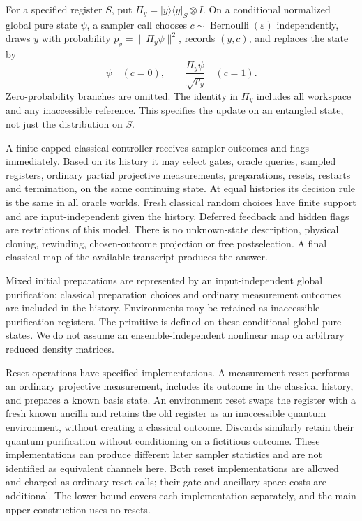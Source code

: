 \documentclass[11pt]{article}
\theoremstyle{remark}
\newcommand{\eps}{\varepsilon}
\newcommand{\ket}[1]{\lvert #1\rangle}
\newcommand{\bra}[1]{\langle #1\rvert}
\begin{document}
For a specified register $S$, put
$\Pi_y=\ket{y}\bra{y}_S\otimes I$. On a conditional normalized global pure
state $\psi$, a sampler call chooses $c\sim\operatorname{Bernoulli}(\eps)$
independently, draws $y$ with probability $p_y=\|\Pi_y\psi\|^2$, records
$(y,c)$, and replaces the state by
\begin{equation}\label{eq:instrument}
 \psi\quad(c=0),\qquad
 \frac{\Pi_y\psi}{\sqrt{p_y}}\quad(c=1).
\end{equation}
Zero-probability branches are omitted. The identity in $\Pi_y$ includes all
workspace and any inaccessible reference. This specifies the update on an
entangled state, not just the distribution on $S$.

A finite capped classical controller receives sampler outcomes and flags
immediately. Based on its history it may select gates, oracle queries,
sampled registers, ordinary partial projective measurements, preparations,
resets, restarts and termination, on the same continuing state. At equal
histories its decision rule is the same in all oracle worlds. Fresh classical
random choices have finite support and are input-independent given the history.
Deferred feedback
and hidden flags are restrictions of this model. There is no unknown-state
description, physical cloning, rewinding, chosen-outcome projection or free
postselection. A final classical map of the available transcript produces
the answer.

Mixed initial preparations are represented by an input-independent global
purification; classical preparation choices and ordinary measurement
outcomes are included in the history. Environments may be retained as
inaccessible purification registers. The primitive is defined on these
conditional global pure states. We do not assume an ensemble-independent
nonlinear map on arbitrary reduced density matrices.

Reset operations have specified implementations. A measurement reset performs
an ordinary projective measurement, includes its outcome in the classical
history, and prepares a known basis state. An environment reset swaps the
register with a fresh known ancilla and retains the old register as an
inaccessible quantum environment, without creating a classical outcome.
Discards similarly retain their quantum purification without conditioning
on a fictitious outcome. These implementations can produce different later
sampler statistics and are not identified as equivalent channels here.
Both reset implementations are allowed and charged as ordinary reset calls;
their gate and ancillary-space costs are additional. The lower bound covers
each implementation separately, and the main upper construction uses no resets.
\end{document}
